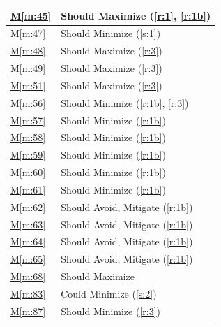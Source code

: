 \documentclass{report}
\newcommand{\mref}[1]{\hyperref[#1]{M\ref{#1}}}
\begin{document}
\begin{tabular}{|l|p{14.35cm}|}
    \hline
    \mref{m:45} & Should Maximize \hfill (\ref{r:1}, \ref{r:1b}) \\
    \hline
    \mref{m:47} & Should Minimize \hfill (\ref{s:1}) \\
    \hline
    \mref{m:48} & Should Maximize \hfill (\ref{r:3}) \\
    \hline
    \mref{m:49} & Should Maximize \hfill (\ref{r:3}) \\
    \hline
    \mref{m:51} & Should Maximize \hfill (\ref{r:3}) \\
    \hline
    \mref{m:56} & Should Minimize \hfill (\ref{r:1b}, \ref{r:3}) \\
    \hline
    \mref{m:57} & Should Minimize \hfill (\ref{r:1b}) \\
    \hline
    \mref{m:58} & Should Minimize \hfill (\ref{r:1b}) \\
    \hline
    \mref{m:59} & Should Minimize \hfill (\ref{r:1b}) \\
    \hline
    \mref{m:60} & Should Minimize \hfill (\ref{r:1b}) \\
    \hline
    \mref{m:61} & Should Minimize \hfill (\ref{r:1b}) \\
    \hline
    \mref{m:62} & Should Avoid, Mitigate \hfill (\ref{r:1b}) \\
    \hline
    \mref{m:63} & Should Avoid, Mitigate \hfill (\ref{r:1b}) \\
    \hline
    \mref{m:64} & Should Avoid, Mitigate \hfill (\ref{r:1b}) \\
    \hline
    \mref{m:65} & Should Avoid, Mitigate \hfill (\ref{r:1b}) \\
    \hline
    \mref{m:68} & Should Maximize \hfill \cite{applicantguide} \\
    \hline
    \mref{m:83} & Could Minimize \hfill (\ref{s:2}) \\
    \hline
    \mref{m:87} & Should Minimize \hfill (\ref{r:3}) \\
    \hline
\end{tabular}

\end{document}
